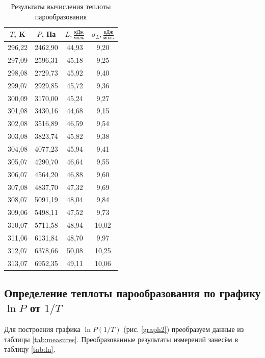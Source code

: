 \documentclass[a4paper, 12pt]{article}
\begin{document}
    \begin{table}[H]
        \centering
        \begin{tabular}{|c|c|c|c|}
        \hline
        $T$, K & $P$, Па & $L, \frac{\text{кДж}}{\text{моль}}$ & $\sigma_L, \frac{\text{кДж}}{\text{моль}}$ \\ \hline
        296,22 & 2462,90 & 44,93 & 9,20 \\ \hline
        297,09 & 2596,31 & 45,18 & 9,25 \\ \hline
        298,08 & 2729,73 & 45,92 & 9,40 \\ \hline
        299,07 & 2929,85 & 45,72 & 9,36 \\ \hline
        300,09 & 3170,00 & 45,24 & 9,27 \\ \hline
        301,08 & 3430,16 & 44,68 & 9,15 \\ \hline
        302,08 & 3516,89 & 46,59 & 9,54 \\ \hline
        303,08 & 3823,74 & 45,82 & 9,38 \\ \hline
        304,08 & 4077,23 & 45,94 & 9,41 \\ \hline
        305,07 & 4290,70 & 46,64 & 9,55 \\ \hline
        306,07 & 4564,20 & 46,88 & 9,60 \\ \hline
        307,08 & 4837,70 & 47,32 & 9,69 \\ \hline
        308,07 & 5091,19 & 48,04 & 9,84 \\ \hline
        309,06 & 5498,11 & 47,52 & 9,73 \\ \hline
        310,07 & 5711,58 & 48,94 & 10,02 \\ \hline
        311,06 & 6131,84 & 48,70 & 9,97 \\ \hline
        312,07 & 6378,66 & 50,08 & 10,25 \\ \hline
        313,07 & 6952,35 & 49,11 & 10,06 \\ \hline
        \end{tabular}   
        \caption{Результаты вычисления теплоты парообразования}
        \label{tab:par}
    \end{table}

    \newpage

    \subsection*{Определение теплоты парообразования по графику $\ln P$ от $1/T$}

    \noindent Для построения графика $\ln P (1/T)$ (рис. \ref{graph2}) преобразуем данные из таблицы \ref{tab:measures}. Преобразованные результаты измерений занесём в таблицу \ref{tab:ln}.
\end{document}
